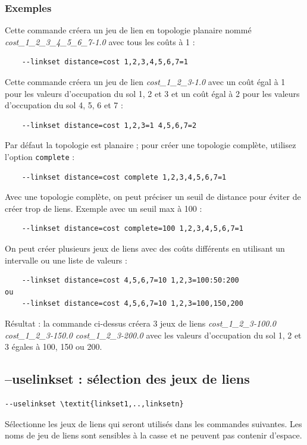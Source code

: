 \documentclass[a4paper,10pt]{report}
\begin{document}
\subsubsection{Exemples}
Cette commande créera un jeu de lien en topologie planaire nommé \textit{cost\_1\_2\_3\_4\_5\_6\_7-1.0} avec tous les coûts à 1 :
\begin{Verbatim}
	--linkset distance=cost 1,2,3,4,5,6,7=1
\end{Verbatim}

Cette commande créera un jeu de lien \textit{cost\_1\_2\_3-1.0} avec un coût égal à 1 pour les valeurs d'occupation du sol 1, 2 et 3 et un coût égal à 2 pour les valeurs d'occupation du sol 4, 5, 6 et 7 :
\begin{Verbatim}
	--linkset distance=cost 1,2,3=1 4,5,6,7=2
\end{Verbatim}

Par défaut la topologie est planaire ; pour créer une topologie complète, utilisez l'option \verb|complete| :
\begin{Verbatim}
	--linkset distance=cost complete 1,2,3,4,5,6,7=1
\end{Verbatim}

Avec une topologie complète, on peut préciser un seuil de distance pour éviter de créer trop de liens. Exemple avec un seuil max à 100 :
\begin{Verbatim}
	--linkset distance=cost complete=100 1,2,3,4,5,6,7=1
\end{Verbatim}

On peut créer plusieurs jeux de liens avec des coûts différents en utilisant un intervalle ou une liste de valeurs :
\begin{Verbatim}
	--linkset distance=cost 4,5,6,7=10 1,2,3=100:50:200
ou
	--linkset distance=cost 4,5,6,7=10 1,2,3=100,150,200
\end{Verbatim}
Résultat : la commande ci-dessus créera 3 jeux de liens \textit{cost\_1\_2\_3-100.0 cost\_1\_2\_3-150.0 cost\_1\_2\_3-200.0}
avec les valeurs d'occupation du sol 1, 2 et 3 égales à 100, 150 ou 200.

\subsection{--uselinkset : sélection des jeux de liens}
\label{uselinkset}
\begin{Verbatim}[commandchars=\\\{\}]
--uselinkset \textit{linkset1,..,linksetn}
\end{Verbatim}
Sélectionne les jeux de liens qui seront utilisés dans les commandes suivantes.
Les noms de jeu de liens sont sensibles à la casse et ne peuvent pas contenir d'espace.
\end{document}
